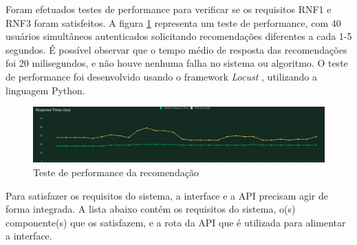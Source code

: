Foram efetuados testes de performance para verificar se os requisitos RNF1 e RNF3 foram satisfeitos. A figura \ref{fig:teste-performance} representa um teste de performance, com 40 usuários simultâneos autenticados solicitando recomendações diferentes a cada 1-5 segundos. É possível observar que o tempo médio de resposta das recomendações foi 20 milisegundos, e não houve nenhuma falha no sistema ou algoritmo. O teste de performance foi desenvolvido usando o framework \textit{Locust} \cite{site-locust}, utilizando a linguagem Python.

\begin{figure}[ht]
    \begin{center}
    \includegraphics[width=390pt]{figuras/teste-performance.png}
    \caption{Teste de performance da recomendação}
    \label{fig:teste-performance}
    \end{center}
\end{figure}

Para satisfazer os requisitos do sistema, a interface e a API precisam agir de forma integrada. A lista abaixo contém os requisitos do sistema, o(s) componente(s) que os satisfazem, e a rota da API que é utilizada para alimentar a interface.

            



